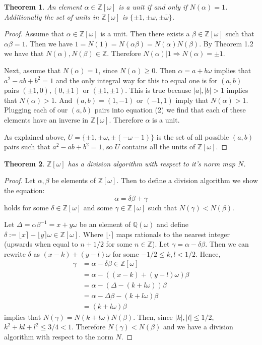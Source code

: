 \documentclass[12pt]{amsart}
\newtheorem{theorem}{Theorem}
\theoremstyle{definition}
\theoremstyle{remark}
\begin{document}
\begin{theorem}\label{Thm:Units}
    An element $\alpha\in\mathbb{Z}[\omega]$ is a unit if and only if $N(\alpha) = 1$. Additionally the set of units in $\mathbb{Z}[\omega]$ is $\{\pm1,\pm\omega,\pm\bar{\omega}\}$.
\end{theorem}
\begin{proof}
    Assume that $\alpha\in\mathbb{Z}[\omega]$ is a unit. Then there exists a $\beta\in\mathbb{Z}[\omega]$ such that $\alpha\beta=1$. Then we have $1 = N(1) = N(\alpha\beta) = N(\alpha)N(\beta)$. By Theorem 1.2 we have that $N(\alpha),N(\beta)\in\mathbb{Z}$. Therefore $N(\alpha)|1\Rightarrow N(\alpha)=\pm1$.
    
    Next, assume that $N(\alpha)=1$, since $N(\alpha)\geq0$. Then $\alpha = a +b\omega$ implies that $a^2-ab+b^2=1$ and the only integral way for this to equal one is for $(a,b)$ pairs $(\pm1,0),(0,\pm1)$ or $(\pm1,\pm1)$. This is true because $|a|,|b|>1$ implies that $N(\alpha)>1$. And $(a,b)=(1,-1)$ or $(-1,1)$ imply that $N(\alpha)>1$. Plugging each of our $(a,b)$ pairs into equation (2) we find that each of these elements have an inverse in $\mathbb{Z}[\omega]$. Therefore $\alpha$ is a unit.
    
    As explained above, $U= \{\pm1,\pm\omega,\pm(-\omega-1)\}$ is the set of all possible $(a,b)$ pairs such that $a^2-ab+b^2=1$, so $U$ contains all the units of $\mathbb{Z}[\omega]$.
\end{proof}
\begin{theorem}\label{Thm:DivAlg}
    $\mathbb{Z}[\omega]$ has a division algorithm with respect to it's norm map $N$. 
\end{theorem}
\begin{proof}
    Let $\alpha,\beta$ be elements of $\mathbb{Z}[\omega]$. Then to define a division algorithm we show the equation:
    $$\alpha = \delta\beta + \gamma$$
    holds for some $\delta\in\mathbb{Z}[\omega]$ and some $\gamma\in\mathbb{Z}[\omega]$ such that $N(\gamma)<N(\beta)$.
    
    Let $\Delta=\alpha\beta^{-1}=x+y\omega$ be an element of $\mathbb{Q}(\omega)$ and define $\delta := \lfloor x\rceil + \lfloor y\rceil\omega \in \mathbb{Z}[\omega]$. Where $\lfloor \cdot\rceil$ maps rationals to the nearest integer (upwards when equal to $n+1/2$ for some $n\in\mathbb{Z}$). Let $\gamma=\alpha-\delta\beta$. Then we can rewrite $\delta$ as $(x-k) + (y-l)\omega$ for some $-1/2 \leq k,l < 1/2$. Hence,
    \begin{align*}
        \gamma &= \alpha - \delta\beta \in \mathbb{Z}[\omega]\\
        &= \alpha - ((x-k) + (y-l)\omega)\beta\\
        &= \alpha - (\Delta - (k + l\omega))\beta\\
        &= \alpha - \Delta\beta - (k+l\omega)\beta\\
        &= (k+l\omega)\beta 
    \end{align*}
    implies that $N(\gamma) = N(k+l\omega)N(\beta)$. Then, since $|k|,|l|\leq1/2$, $k^2+kl+l^2 \leq 3/4 < 1$. Therefore $N(\gamma) < N(\beta)$ and we have a division algorithm with respect to the norm $N$.
\end{proof}
\end{document}
